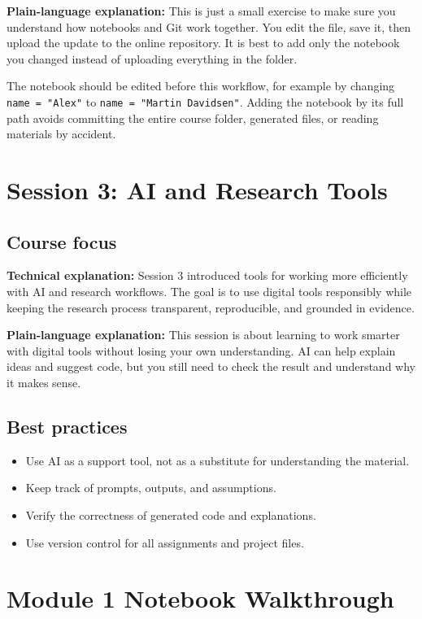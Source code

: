 \documentclass[11pt,a4paper]{article}
\begin{document}
\textbf{Plain-language explanation:} This is just a small exercise to make sure you understand how notebooks and Git work together. You edit the file, save it, then upload the update to the online repository. It is best to add only the notebook you changed instead of uploading everything in the folder.

The notebook should be edited before this workflow, for example by changing \texttt{name = "Alex"} to \texttt{name = "Martin Davidsen"}. Adding the notebook by its full path avoids committing the entire course folder, generated files, or reading materials by accident.

\section{Session 3: AI and Research Tools}

\subsection{Course focus}
\textbf{Technical explanation:} Session 3 introduced tools for working more efficiently with AI and research workflows. The goal is to use digital tools responsibly while keeping the research process transparent, reproducible, and grounded in evidence.

\textbf{Plain-language explanation:} This session is about learning to work smarter with digital tools without losing your own understanding. AI can help explain ideas and suggest code, but you still need to check the result and understand why it makes sense.

\subsection{Best practices}
\begin{itemize}[leftmargin=1.5em]
    \item Use AI as a support tool, not as a substitute for understanding the material.
    \item Keep track of prompts, outputs, and assumptions.
    \item Verify the correctness of generated code and explanations.
    \item Use version control for all assignments and project files.
\end{itemize}

\section{Module 1 Notebook Walkthrough}
\end{document}
